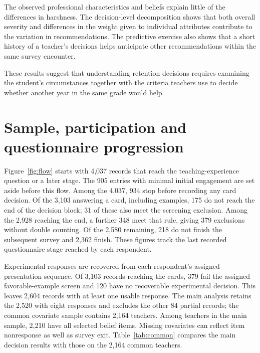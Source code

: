 The observed professional characteristics and beliefs explain little of the differences in harshness. The decision-level decomposition shows that both overall severity and differences in the weight given to individual attributes contribute to the variation in recommendations. The predictive exercise also shows that a short history of a teacher's decisions helps anticipate other recommendations within the same survey encounter.

These results suggest that understanding retention decisions requires examining the student's circumstances together with the criteria teachers use to decide whether another year in the same grade would help.

\clearpage\color{black}
\clearpage\appendix{}\color{reused}
\color{reused}
\section{Sample, participation and questionnaire progression}\label{app:sample}
Figure~\ref{fig:flow} starts with 4,037 records that reach the teaching-experience question or a later stage. The 905 entries with minimal initial engagement are set aside before this flow. Among the 4,037, 934 stop before recording any card decision. Of the 3,103 answering a card, including examples, 175 do not reach the end of the decision block; 31 of these also meet the screening exclusion. Among the 2,928 reaching the end, a further 348 meet that rule, giving 379 exclusions without double counting. Of the 2,580 remaining, 218 do not finish the subsequent survey and 2,362 finish. These figures track the last recorded questionnaire stage reached by each respondent.

Experimental responses are recovered from each respondent's assigned presentation sequence. Of 3,103 records reaching the cards, 379 fail the assigned favorable-example screen and 120 have no recoverable experimental decision. This leaves 2,604 records with at least one usable response. The main analysis retains the 2,520 with eight responses and excludes the other 84 partial records; the common covariate sample contains 2,164 teachers. Among teachers in the main sample, 2,210 have all selected belief items. Missing covariates can reflect item nonresponse as well as survey exit. Table~\ref{tab:common} compares the main decision results with those on the 2,164 common teachers.

